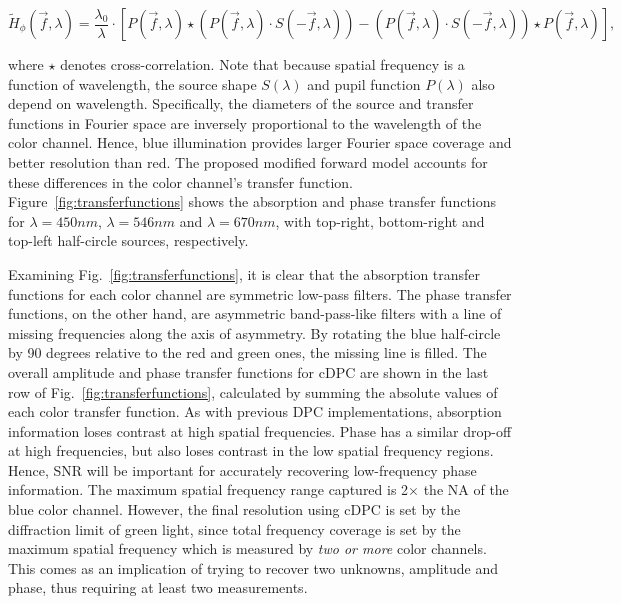 \begin{equation}\label{WOTFim}
\tilde{H}_{\phi}(\vec{f},\lambda) = \frac{\lambda_0}{\lambda}\cdot\left[ P(\vec{f},\lambda) \star (P(\vec{f},\lambda)\cdot S(-\vec{f},\lambda))- (P(\vec{f},\lambda) \cdot S(-\vec{f},\lambda)) \star P(\vec{f},\lambda) \right],
\end{equation}

\noindent where $\star$ denotes cross-correlation. Note that because spatial frequency is a function of wavelength, the source shape $S(\lambda)$ and pupil function $P(\lambda)$ also depend on wavelength. Specifically, the diameters of the source and transfer functions in Fourier space are inversely proportional to the wavelength of the color channel. Hence, blue illumination provides larger Fourier space coverage and better resolution than red. The proposed modified forward model accounts for these differences in the color channel's transfer function. Figure~\ref{fig:transferfunctions} shows the absorption and phase transfer functions for $\lambda = 450 nm$, $\lambda = 546 nm$ and $\lambda = 670 nm$, with top-right, bottom-right and top-left half-circle sources, respectively.

Examining Fig.~\ref{fig:transferfunctions}, it is clear that the absorption transfer functions for each color channel are symmetric low-pass filters. The phase transfer functions, on the other hand, are asymmetric band-pass-like filters with a line of missing frequencies along the axis of asymmetry. By rotating the blue half-circle by 90 degrees relative to the red and green ones, the missing line is filled. The overall amplitude and phase transfer functions for cDPC are shown in the last row of Fig.~\ref{fig:transferfunctions}, calculated by summing the absolute values of each color transfer function. As with previous DPC implementations, absorption information loses contrast at high spatial frequencies. Phase has a similar drop-off at high frequencies, but also loses contrast in the low spatial frequency regions. Hence, SNR will be important for accurately recovering low-frequency phase information. The maximum spatial frequency range captured is 2$\times$ the NA of the blue color channel. However, the final resolution using cDPC is set by the diffraction limit of green light, since total frequency coverage is set by the maximum spatial frequency which is measured by \textit{two or more} color channels. This comes as an implication of trying to recover two unknowns, amplitude and phase, thus requiring at least two measurements.


